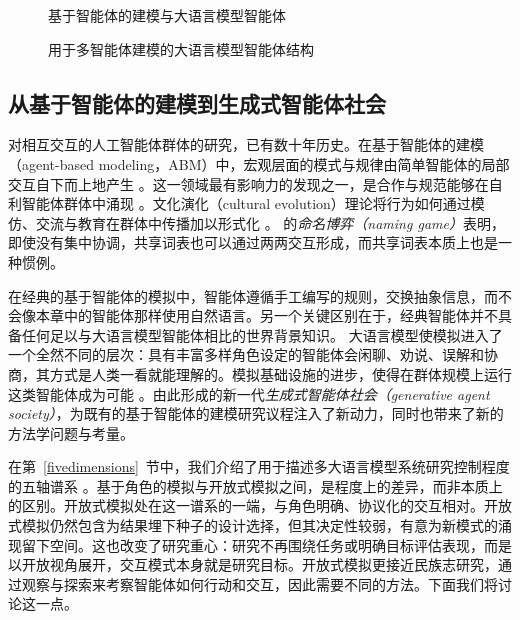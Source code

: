 \begin{figure}
  \begin{center}
    
    \caption{基于智能体的建模与大语言模型智能体 \citep{gao2024large}}\label{fig:abm}
  \end{center}
\end{figure}

\begin{figure}
  \begin{center}
    
    \caption{用于多智能体建模的大语言模型智能体结构 \citep{gao2023s}}\label{fig:struct}
  \end{center}
\end{figure}

\subsection{从基于智能体的建模到生成式智能体社会}
对相互交互的人工智能体群体的研究，已有数十年历史。在基于智能体的建模（agent-based modeling，ABM）中，宏观层面的模式与规律由简单智能体的局部交互自下而上地产生 \citep{epstein1996growing, macal_tutorial_2010}。这一领域最有影响力的发现之一，是合作与规范能够在自利智能体群体中涌现 \citep{axelrod1986evolutionary}。文化演化（cultural evolution）理论将行为如何通过模仿、交流与教育在群体中传播加以形式化 \citep{boyd1988culture}。\citet{steels1995self} 的\emph{命名博弈（naming game）}表明，即使没有集中协调，共享词表也可以通过两两交互形成，而共享词表本质上也是一种惯例。

在经典的基于智能体的模拟中，智能体遵循手工编写的规则，交换抽象信息，而不会像本章中的智能体那样使用自然语言。另一个关键区别在于，经典智能体并不具备任何足以与大语言模型智能体相比的世界背景知识。
大语言模型使模拟进入了一个全然不同的层次：具有丰富多样角色设定的智能体会闲聊、劝说、误解和协商，其方式是人类一看就能理解的。模拟基础设施的进步，使得在群体规模上运行这类智能体成为可能 \citep{gao2024large, yang2024oasis}。由此形成的新一代\emph{生成式智能体社会（generative agent society）}，为既有的基于智能体的建模研究议程注入了新动力，同时也带来了新的方法学问题与考量。

在第~\ref{fivedimensions}~节中，我们介绍了用于描述多大语言模型系统研究控制程度的五轴谱系 \citep{tran2025multi}。基于角色的模拟与开放式模拟之间，是程度上的差异，而非本质上的区别。开放式模拟处在这一谱系的一端，与角色明确、协议化的交互相对。开放式模拟仍然包含为结果埋下种子的设计选择，但其决定性较弱，有意为新模式的涌现留下空间。这也改变了研究重心：研究不再围绕任务或明确目标评估表现，而是以开放视角展开，交互模式本身就是研究目标。开放式模拟更接近民族志研究，通过观察与探索来考察智能体如何行动和交互，因此需要不同的方法。下面我们将讨论这一点。

